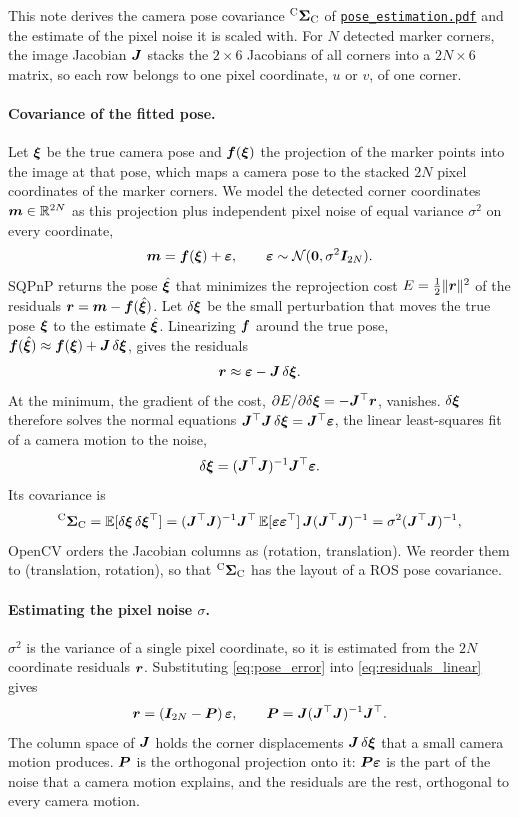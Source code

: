 \documentclass{article}
\begin{document}
This note derives the camera pose covariance ${}^{\mathrm{C}} \bm{\Sigma}_{\mathrm{C}}$ of \href{pose_estimation.pdf}{\texttt{pose\_estimation.pdf}} and the estimate of the pixel noise it is scaled with.
For $N$ detected marker corners, the image Jacobian $\bm{J}$ stacks the $2 \times 6$ Jacobians of all corners into a $2N \times 6$ matrix, so each row belongs to one pixel coordinate, $u$ or $v$, of one corner.

\paragraph{Covariance of the fitted pose.}
Let $\bm{\xi}$ be the true camera pose and $\bm{f}(\bm{\xi})$ the projection of the marker points into the image at that pose, which maps a camera pose to the stacked $2N$ pixel coordinates of the marker corners. We model the detected corner coordinates $\bm{m} \in \mathbb{R}^{2N}$ as this projection plus independent pixel noise of equal variance $\sigma^2$ on every coordinate,
\[
  \bm{m} = \bm{f}(\bm{\xi}) + \bm{\varepsilon}, \qquad \bm{\varepsilon} \sim \mathcal{N}(\bm{0}, \sigma^2 \bm{I}_{2N}).
\]
SQPnP returns the pose $\hat{\bm{\xi}}$ that minimizes the reprojection cost $E = \frac{1}{2} \lVert \bm{r} \rVert^2$ of the residuals $\bm{r} = \bm{m} - \bm{f}(\hat{\bm{\xi}})$. Let $\delta\bm{\xi}$ be the small perturbation that moves the true pose $\bm{\xi}$ to the estimate $\hat{\bm{\xi}}$. Linearizing $\bm{f}$ around the true pose, $\bm{f}(\hat{\bm{\xi}}) \approx \bm{f}(\bm{\xi}) + \bm{J} \, \delta\bm{\xi}$, gives the residuals
\begin{equation}
  \bm{r} \approx \bm{\varepsilon} - \bm{J} \, \delta\bm{\xi} . \label{eq:residuals_linear}
\end{equation}
At the minimum, the gradient of the cost, $\partial E / \partial \delta\bm{\xi} = -\bm{J}^\top \bm{r}$, vanishes. $\delta\bm{\xi}$ therefore solves the normal equations $\bm{J}^\top \bm{J} \, \delta\bm{\xi} = \bm{J}^\top \bm{\varepsilon}$, the linear least-squares fit of a camera motion to the noise,
\begin{equation}
  \delta\bm{\xi} = (\bm{J}^\top \bm{J})^{-1} \bm{J}^\top \bm{\varepsilon} . \label{eq:pose_error}
\end{equation}
Its covariance is
\[
  {}^{\mathrm{C}} \bm{\Sigma}_{\mathrm{C}} = \mathbb{E}[\delta\bm{\xi} \, \delta\bm{\xi}^\top]
  = (\bm{J}^\top \bm{J})^{-1} \bm{J}^\top \, \mathbb{E}[\bm{\varepsilon} \bm{\varepsilon}^\top] \, \bm{J} (\bm{J}^\top \bm{J})^{-1}
  = \sigma^2 (\bm{J}^\top \bm{J})^{-1},
\]
OpenCV orders the Jacobian columns as (rotation, translation). We reorder them to (translation, rotation), so that ${}^{\mathrm{C}} \bm{\Sigma}_{\mathrm{C}}$ has the layout of a ROS pose covariance.

\paragraph{Estimating the pixel noise $\sigma$.}
$\sigma^2$ is the variance of a single pixel coordinate, so it is estimated from the $2N$ coordinate residuals $\bm{r}$. Substituting \eqref{eq:pose_error} into \eqref{eq:residuals_linear} gives
\[
  \bm{r} = (\bm{I}_{2N} - \bm{P})\, \bm{\varepsilon}, \qquad \bm{P} = \bm{J} (\bm{J}^\top \bm{J})^{-1} \bm{J}^\top .
\]
The column space of $\bm{J}$ holds the corner displacements $\bm{J} \, \delta\bm{\xi}$ that a small camera motion produces. $\bm{P}$ is the orthogonal projection onto it: $\bm{P} \bm{\varepsilon}$ is the part of the noise that a camera motion explains, and the residuals are the rest, orthogonal to every camera motion.
\end{document}
